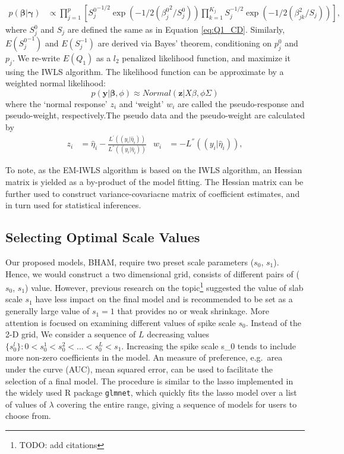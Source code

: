 \documentclass[AMA,STIX1COL,]{WileyNJD-v2}
\begin{document}
\[
\begin{aligned}
p(\boldsymbol{\beta }| \boldsymbol{\gamma}) &\propto \prod\limits_{j=1}^{p}\left[{S^0_j}^{-1/2}\exp(-1/2({\beta^0_{j}}^2/S^0_{j}))\prod\limits_{k=1}^{K_j}S_{j}^{-1/2}\exp(-1/2(\beta_{jk}^2/S_{j}))\right],
\end{aligned}
\] where \(S_{j}^0\) and \(S_{j}\) are defined the same as in Equation
\ref{eq:Q1_CD}. Similarly, \(E({S_j^0}^{-1})\) and \(E(S^{-1}_j)\) are
derived via Bayes' theorem, conditioning on \(p^0_j\) and \(p_j\). We
re-write \(E(Q_1)\) as a \(l_2\) penalized likelihood function, and
maximize it using the IWLS algorithm. The likelihood function can be
approximate by a weighted normal likelihood: \[
  p(\textbf{y}|\boldsymbol{\beta}, \phi) \approx Normal(\textbf{z}|X\beta, \phi\Sigma)
\] where the `normal response' \(z_i\) and `weight' \(w_i\) are called
the pseudo-response and pseudo-weight, respectively.The pseudo data and
the pseudo-weight are calculated by \[
\begin{aligned}
z_i &= \hat\eta_i - \frac{L^{'}((y_i|\hat\eta_i))}{L^{''}((y_i|\hat\eta_i))}& w_i &= - L^{''}((y_i|\hat\eta_i)),
\end{aligned}
\]

To note, as the EM-IWLS algorithm is based on the IWLS algorithm, an
Hessian matrix is yielded as a by-product of the model fitting. The
Hessian matrix can be further used to construct variance-covariacne
matrix of coefficient estimates, and in turn used for statistical
inferences.

\hypertarget{selecting-optimal-scale-values}{%
\subsection{Selecting Optimal Scale
Values}\label{selecting-optimal-scale-values}}

\label{sec:tune} Our proposed models, BHAM, require two preset scale
parameters (\(s_0\), \(s_1\)). Hence, we would construct a two
dimensional grid, consists of different pairs of (\(s_0\), \(s_1\))
value. However, previous research on the topic\footnote{TODO: add
  citations} suggested the value of slab scale \(s_1\) have less impact
on the final model and is recommended to be set as a generally large
value of \(s_1 = 1\) that provides no or weak shrinkage. More attention
is focused on examining different values of spike scale \(s_0\). Instead
of the 2-D grid, We consider a sequence of \(L\) decreasing values
\(\{s_0^l\}: 0 < s_0^1 < s_0^2 < \dots < s_0^L < s_1\). Increasing the
spike scale s\_0 tends to include more non-zero coefficients in the
model. An measure of preference, e.g.~area under the curve (AUC), mean
squared error, can be used to facilitate the selection of a final model.
The procedure is similar to the lasso implemented in the widely used R
package \texttt{glmnet}, which quickly fits the lasso model over a list
of values of \(\lambda\) covering the entire range, giving a sequence of
models for users to choose from.
\end{document}
